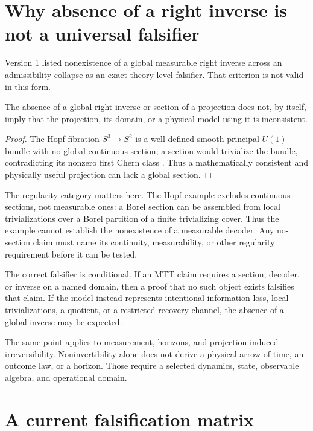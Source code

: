 \documentclass[11pt]{article}
\begin{document}
\section{Why absence of a right inverse is not a universal falsifier}

Version 1 listed nonexistence of a global measurable right inverse across an
admissibility collapse as an exact theory-level falsifier. That criterion is
not valid in this form.

\begin{proposition}
\label{prop:no-section}
The absence of a global right inverse or section of a projection does not, by
itself, imply that the projection, its domain, or a physical model using it is
inconsistent.
\end{proposition}

\begin{proof}
The Hopf fibration \(S^3\to S^2\) is a well-defined smooth principal
\(U(1)\)-bundle with no global continuous section; a section would trivialize
the bundle, contradicting its nonzero first Chern class
\cite{BottTu1982}. Thus a mathematically consistent and physically useful
projection can lack a global section.
\end{proof}

The regularity category matters here. The Hopf example excludes continuous
sections, not measurable ones: a Borel section can be assembled from local
trivializations over a Borel partition of a finite trivializing cover.
Thus the example cannot establish the nonexistence of a measurable decoder.
Any no-section claim must name its continuity, measurability, or other
regularity requirement before it can be tested.

The correct falsifier is conditional. If an MTT claim requires a section,
decoder, or inverse on a named domain, then a proof that no such object exists
falsifies that claim. If the model instead represents intentional information
loss, local trivializations, a quotient, or a restricted recovery channel,
the absence of a global inverse may be expected.

The same point applies to measurement, horizons, and projection-induced
irreversibility. Noninvertibility alone does not derive a physical arrow of
time, an outcome law, or a horizon. Those require a selected dynamics,
state, observable algebra, and operational domain.

\section{A current falsification matrix}
\end{document}
